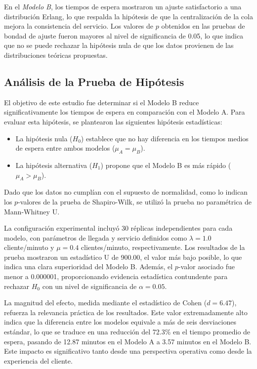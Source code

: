 \documentclass[a4paper,12pt]{article}
\begin{document}
En el \textit{Modelo B}, los tiempos de espera mostraron un ajuste satisfactorio a una distribución Erlang, lo que respalda la hipótesis de que la centralización de la cola mejora la consistencia del servicio. Los valores de \( p \) obtenidos en las pruebas de bondad de ajuste fueron mayores al nivel de significancia de 0.05, lo que indica que no se puede rechazar la hipótesis nula de que los datos provienen de las distribuciones teóricas propuestas.

\subsection{Análisis de la Prueba de Hipótesis}

El objetivo de este estudio fue determinar si el Modelo B reduce significativamente los tiempos de espera en comparación con el Modelo A. Para evaluar esta hipótesis, se plantearon las siguientes hipótesis estadísticas: 
\begin{itemize}
    \item La hipótesis nula (\( H_0 \)) establece que no hay diferencia en los tiempos medios de espera entre ambos modelos (\( \mu_A = \mu_B \)). 
    \item La hipótesis alternativa (\( H_1 \)) propone que el Modelo B es más rápido (\( \mu_A > \mu_B \)).
\end{itemize}


Dado que los datos no cumplían con el supuesto de normalidad, como lo indican los \( p \)-valores de la prueba de Shapiro-Wilk, se utilizó la prueba no paramétrica de Mann-Whitney U.

La configuración experimental incluyó 30 réplicas independientes para cada modelo, con parámetros de llegada y servicio definidos como \( \lambda = 1.0 \) cliente/minuto y \( \mu = 0.4 \) clientes/minuto, respectivamente. Los resultados de la prueba mostraron un estadístico U de 900.00, el valor más bajo posible, lo que indica una clara superioridad del Modelo B. Además, el \( p \)-valor asociado fue menor a 0.000001, proporcionando evidencia estadística contundente para rechazar \( H_0 \) con un nivel de significancia de \( \alpha = 0.05 \).

La magnitud del efecto, medida mediante el estadístico de Cohen (\( d = 6.47 \)), refuerza la relevancia práctica de los resultados. Este valor extremadamente alto indica que la diferencia entre los modelos equivale a más de seis desviaciones estándar, lo que se traduce en una reducción del 72.3\% en el tiempo promedio de espera, pasando de 12.87 minutos en el Modelo A a 3.57 minutos en el Modelo B. Este impacto es significativo tanto desde una perspectiva operativa como desde la experiencia del cliente.
\end{document}
